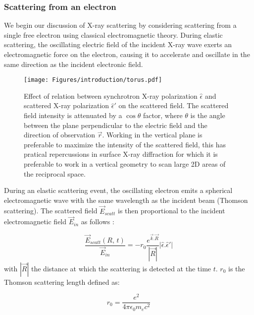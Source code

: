 \subsubsection{Scattering from an electron}

We begin our discussion of X-ray scattering by considering scattering from a single free electron using classical electromagnetic theory.
During elastic scattering, the oscillating electric field of the incident X-ray wave exerts an electromagnetic force on the electron, causing it to accelerate and oscillate in the same direction as the incident electronic field.

\begin{figure}[!htb]
    \centering
    \texttt{[image: Figures/introduction/torus.pdf]}
    \caption{
        Effect of relation between synchrotron X-ray polarization $\hat{\epsilon}$ and scattered X-ray polarization $\hat{\epsilon}'$ on the scattered field.
        The scattered field intensity is attenuated by a $\cos{\theta}$ factor, where $\theta$ is the angle between the plane perpendicular to the electric field and the direction of observation $\vec{r}$.
        Working in the vertical plane is preferable to maximize the intensity of the scattered field, this has pratical repercussions in surface X-ray diffraction for which it is preferable to work in a vertical geometry to scan large 2D areas of the reciprocal space.
    }
    \label{fig:polarization_effect}
\end{figure}

During an elastic scattering event, the oscillating electron emits a spherical electromagnetic wave with the same wavelength as the incident beam (Thomson scattering).
The scattered field $\vec{E}_{scatt}$ is then proportional to the incident electromagnetic field $\vec{E}_{in}$ as follows \parencite{NielsenMcMorrow}:

\begin{equation}
    \label{eq:scatt_field}
    \frac{\vec{E}_{scatt}(R, \, t)} {\vec{E}_{in}} = -r_0 \frac{e^{\vec{k}.\vec{R}}} {|\vec{R}|}| \hat{\epsilon}.\hat{\epsilon}'|
\end{equation}
with $|\vec{R}|$ the distance at which the scattering is detected at the time $t$. $r_0$ is the Thomson scattering length defined as:

\begin{equation}
    \label{eq:scatt_thomson_scat_length}
    r_0 = \frac{e^2} {4\pi\epsilon_0 m_e c^2}
\end{equation}

